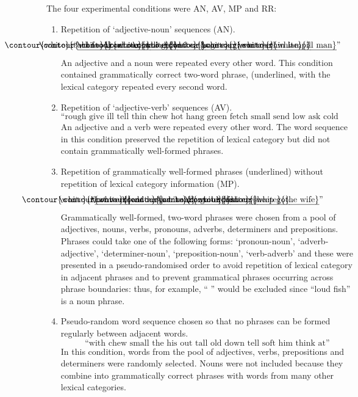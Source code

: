 \documentclass[10pt,letterpaper]{article}
\newcommand{\myuline}[1]{%
  \uline{\phantom{#1}}%
  \llap{\contour{white}{#1}}%
}
\begin{document}
The four experimental conditions were AN, AV, MP and RR:
\begin{enumerate}
\item Repetition of `adjective-noun' sequences (AN). 
\[
\label{eq:AN}
\text{``\myuline{cold food} \myuline{loud room} \myuline{tall girl} \myuline{bad cat} \myuline{huge car} \myuline{green tree} \myuline{thin lamp} \myuline{ill man}''}
\]
An adjective and a noun were repeated every other word. This condition
contained grammatically correct two-word phrase, (underlined, with the
lexical category repeated every second word.

\item Repetition of `adjective-verb' sequences (AV).
\[
\label{eq:AV}
\text{``rough give ill tell thin chew hot hang green fetch small send low ask cold weep''}
\]
An adjective and a verb were repeated every other word. The word
sequence in this condition preserved the repetition of lexical
category but did not contain grammatically well-formed phrases.

\item Repetition of grammatically well-formed phrases (underlined) without repetition of lexical category information (MP).
\[
\label{eq:MP}
\text{``\myuline{that word} \myuline{send less} \myuline{not loud} \myuline{huge bird} \myuline{fish cry} \myuline{sheep go} \myuline{the wife}''}
\]
Grammatically well-formed, two-word phrases were chosen from a pool of adjectives, nouns, verbs, pronouns, adverbs, determiners and prepositions. Phrases could take one of the following forms: `pronoun-noun', `adverb-adjective', `determiner-noun', `preposition-noun',  `verb-adverb' and these were presented in a pseudo-randomised order to avoid repetition of lexical category in adjacent phrases and to prevent grammatical phrases occurring across phrase boundaries: thus, for example, ``\myuline{not loud} \myuline{fish cry}'' would be excluded since ``loud fish'' is a noun phrase.

\item Pseudo-random word sequence chosen so that no phrases can be formed regularly between adjacent words.
\[
\label{eq:RR}
\text{``with chew small the his out tall old down tell soft him think at''}
\]
In this condition, words from the pool of adjectives, verbs, prepositions and determiners were randomly selected. Nouns were not included because they combine into grammatically correct phrases with words from many other lexical categories.
\end{enumerate}
\end{document}
